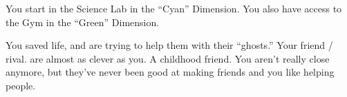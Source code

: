 \documentclass[char]{TMFHope}
\begin{document}
\begin{itemz}[Notes]
	\item You start in the Science Lab in the ``Cyan'' Dimension. You also have access to the Gym in the ``Green'' Dimension. 
\end{itemz}

\begin{contacts}
	\contact{\cCap{}} You saved \cCap{\their} life, and are trying to help them with their ``ghosts.''
	\contact{\cSci{}} Your friend / rival. \cSci{\They} are almost as clever as you.
	\contact{\cDip{}} A childhood friend. You aren't really close anymore, but they've never been good at making friends and you like helping people.
\end{contacts}
\end{document}
